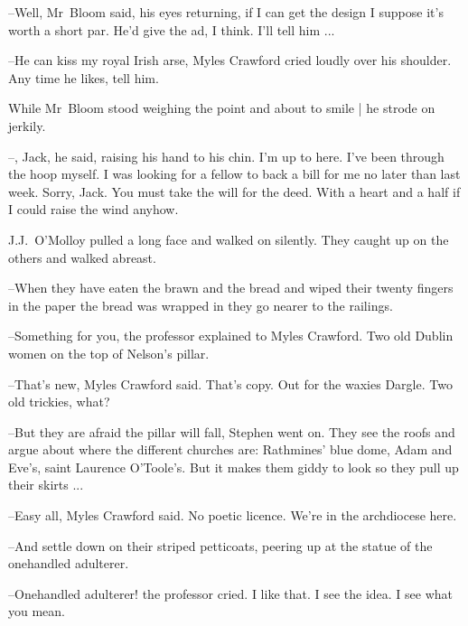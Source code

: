 --Well,
Mr~Bloom said,
his eyes returning,
if I can get the design
I suppose it's worth a short par.
He'd give the ad, I think.
I'll tell him ...



--He can kiss my royal Irish arse,
Myles Crawford cried loudly over his shoulder.
Any time he likes, tell him.

While Mr~Bloom stood weighing the point
and about to smile |
he strode on jerkily.



--, Jack,
he said,
raising his hand to his chin.
I'm up to here.
I've been through the hoop myself.
I was looking for a fellow to back a bill for me no later than last week.
Sorry, Jack.
You must take the will for the deed.
With a heart and a half if I could raise the wind anyhow.

J.J.~O'Molloy pulled a long face and walked on silently.
They caught up on the others and walked abreast.

--When they have eaten the brawn and the bread
and wiped their twenty fingers in the paper the bread was wrapped in
they go nearer to the railings.

--Something for you,
the professor explained to Myles Crawford.
Two old Dublin women on the top of Nelson's pillar.



--That's new,
Myles Crawford said.
That's copy.
Out for the waxies Dargle.
Two old trickies, what?

--But they are afraid the pillar will fall,
Stephen went on.
They see the roofs and argue about where the different churches are:
Rathmines' blue dome,
Adam and Eve's,
saint Laurence O'Toole's.
But it makes them giddy to look
so they pull up their skirts ...



--Easy all,
Myles Crawford said.
No poetic licence.
We're in the archdiocese here.

--And settle down on their striped petticoats,
peering up at the statue of the onehandled adulterer.

--Onehandled adulterer!
the professor cried.
I like that.
I see the idea.
I see what you mean.



